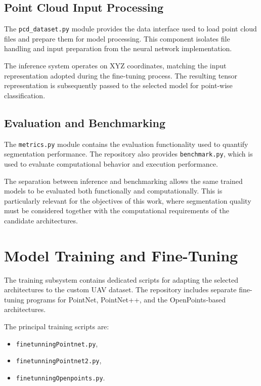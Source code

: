 \subsection{Point Cloud Input Processing}

The \texttt{pcd\_dataset.py} module provides the data interface used to load point cloud files and prepare them for model processing. This component isolates file handling and input preparation from the neural network implementation.

The inference system operates on XYZ coordinates, matching the input representation adopted during the fine-tuning process. The resulting tensor representation is subsequently passed to the selected model for point-wise classification.

\subsection{Evaluation and Benchmarking}

The \texttt{metrics.py} module contains the evaluation functionality used to quantify segmentation performance. The repository also provides \texttt{benchmark.py}, which is used to evaluate computational behavior and execution performance.

The separation between inference and benchmarking allows the same trained models to be evaluated both functionally and computationally. This is particularly relevant for the objectives of this work, where segmentation quality must be considered together with the computational requirements of the candidate architectures.

\section{Model Training and Fine-Tuning}
\label{sec:software_training}

The training subsystem contains dedicated scripts for adapting the selected architectures to the custom UAV dataset. The repository includes separate fine-tuning programs for PointNet, PointNet++, and the OpenPoints-based architectures.

The principal training scripts are:

\begin{itemize}
\item \texttt{finetunningPointnet.py},
\item \texttt{finetunningPointnet2.py},
\item \texttt{finetunningOpenpoints.py}.
\end{itemize}

